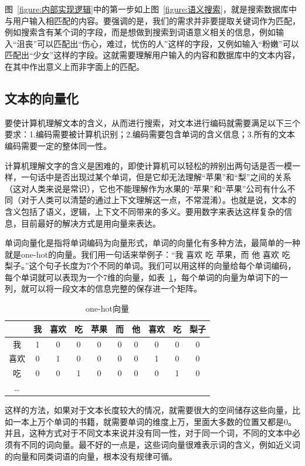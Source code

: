 图~\ref{figure:内部实现逻辑}中的第一步如上图~\ref{figure:语义搜索}，就是搜索数据库中与用户输入相匹配的内容。要强调的是，我们的需求并非要提取关键词作为匹配，例如搜索含有某个词的字段，而是想做到搜索到词语意义相关的信息，例如输入“沮丧”可以匹配出“伤心，难过，忧伤的人”这样的字段，又例如输入“粉嫩”可以匹配出“少女”这样的字段。这就需要理解用户输入的内容和数据库中的文本内容，在其中作出意义上而非字面上的匹配。

\subsection{文本的向量化}

要使计算机理解文本的含义，从而进行搜索，对文本进行编码就需要满足以下三个要求：1.编码需要被计算机识别；2.编码需要包含单词的含义信息；3.所有的文本编码需要一定的整体同一性。

计算机理解文字的含义是困难的，即使计算机可以轻松的辨别出两句话是否一模一样，一句话中是否出现过某个单词，但是它却无法理解“苹果”和“梨”之间的关系（这对人类来说是常识），它也不能理解作为水果的“苹果”和“苹果”公司有什么不同（对于人类可以清楚的通过上下文理解这一点，不常混淆）。也就是说，文本的含义包括了语义，逻辑，上下文不同带来的多义。要用数字来表达这样复杂的信息，目前最好的解决方式是用向量来表达。

单词向量化是指将单词编码为向量形式，单词的向量化有多种方法，最简单的一种就是one-hot的向量。\cite{athier1997process}我们用一句话来举例子：“我 喜欢 吃 苹果，而 他 喜欢 吃 梨子。”这个句子长度为7个不同的单词。我们可以用这样的向量给每个单词编码，每个单词就可以表现为一个7维的向量，如表~\ref{table:one-hot}，每个单词的向量为单词下的一列，就可以将一段文本的信息完整的保存进一个矩阵。

\begin{table}[!htbp]
\caption{one-hot向量}
\label{table:one-hot}
\centering
\begin{tabular}{|c|c|c|c|c|c|c|c|c|c|}
\hline
  & 我 & 喜欢 & 吃 & 苹果 & 而 & 他 & 喜欢 & 吃 & 梨子 \\
\hline
我 & 1 & 0 & 0 & 0 & 0 & 0 & 0 & 0 & 0 \\
\hline
喜欢 & 0 & 1 & 0 & 0 & 0 & 0 & 1 & 0 & 0 \\
\hline
吃 & 0 & 0 & 1 & 0 & 0 & 0 & 0 & 1 & 0 \\
\hline
… &  &  &  &  &  &  &  &  &  \\
\hline
\end{tabular}
\end{table}

这样的方法，如果对于文本长度较大的情况，就需要很大的空间储存这些向量，比如一本上万个单词的书籍，就需要单词的维度上万，里面大多数的位置又都是0。并且，这种方式对于不同文本来说并没有同一性，对于同一个词，不同的文本中必须有不同的词向量。最不好的一点是，这些词向量很难表示词的含义，例如近义词的向量和同类词语的向量，根本没有规律可循。

